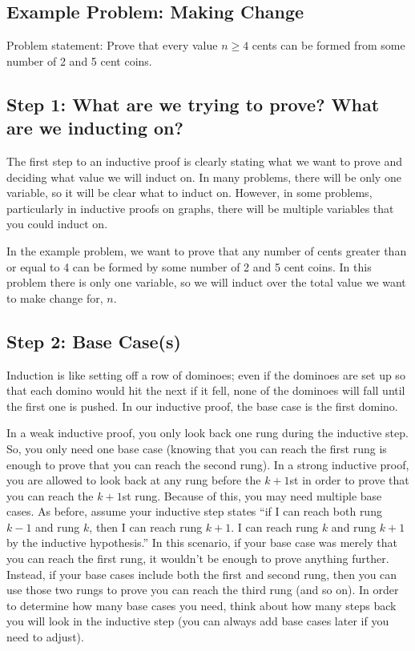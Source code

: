 \documentclass{article}
\theoremstyle{definition}
\begin{document}
\subsection*{Example Problem: Making Change}
Problem statement: Prove that every value $n \geq 4$ cents can be formed from some number of 2 and 5 cent coins.

\subsection*{Step 1: What are we trying to prove? What are we inducting on?}
The first step to an inductive proof is clearly stating what we want to prove and deciding what value we will induct on. In many problems, there will be only one variable, so it will be clear what to induct on. However, in some problems, particularly in inductive proofs on graphs, there will be multiple variables that you could induct on. 

In the example problem, we want to prove that any number of cents greater than or equal to 4 can be formed by some number of 2 and 5 cent  coins. In this problem there is only one variable, so we will induct over the total value we want to make change for, $n$. 

\subsection*{Step 2: Base Case(s)}
Induction is like setting off a row of dominoes; even if the dominoes are set up so that each domino would hit the next if it fell, none of the dominoes will fall until the first one is pushed. In our inductive proof, the base case is the first domino. 

In a weak inductive proof, you only look back one rung during the inductive step. So, you only need one base case (knowing that you can reach the first rung is enough to prove that you can reach the second rung). In a strong inductive proof, you are allowed to look back at any rung before the $k+1$st in order to prove that you can reach the $k+1$st rung. Because of this, you may need multiple base cases. As before, assume your inductive step states ``if I can reach both rung $k-1$ and rung $k$, then I can reach rung $k+1$. I can reach rung $k$ and rung $k+1$ by the inductive hypothesis.'' In this scenario, if your base case was merely that you can reach the first rung, it wouldn't be enough to prove anything further. Instead, if your base cases include both the first and second rung, then you can use those two rungs to prove you can reach the third rung (and so on). In order to determine how many base cases you need, think about how many steps back you will look in the inductive step (you can always add base cases later if you need to adjust).
\end{document}
